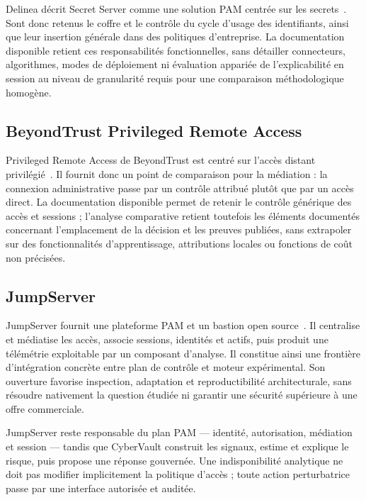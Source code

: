 \documentclass[11pt,a4paper,oneside]{report}
\theoremstyle{definition}
\theoremstyle{plain}
\begin{document}
Delinea décrit Secret Server comme une solution PAM centrée sur les secrets~\cite{ref18}. Sont donc retenus le coffre et le contrôle du cycle d'usage des identifiants, ainsi que leur insertion générale dans des politiques d'entreprise. La documentation disponible retient ces responsabilités fonctionnelles, sans détailler connecteurs, algorithmes, modes de déploiement ni évaluation appariée de l'explicabilité en session au niveau de granularité requis pour une comparaison méthodologique homogène.

\subsection{BeyondTrust Privileged Remote Access}

Privileged Remote Access de BeyondTrust est centré sur l'accès distant privilégié~\cite{ref17}. Il fournit donc un point de comparaison pour la médiation : la connexion administrative passe par un contrôle attribué plutôt que par un accès direct. La documentation disponible permet de retenir le contrôle générique des accès et sessions ; l'analyse comparative retient toutefois les éléments documentés concernant l'emplacement de la décision et les preuves publiées, sans extrapoler sur des fonctionnalités d'apprentissage, attributions locales ou fonctions de coût non précisées.

\subsection{JumpServer}

JumpServer fournit une plateforme PAM et un bastion open source~\cite{ref5}. Il centralise et médiatise les accès, associe sessions, identités et actifs, puis produit une télémétrie exploitable par un composant d'analyse. Il constitue ainsi une frontière d'intégration concrète entre plan de contrôle et moteur expérimental. Son ouverture favorise inspection, adaptation et reproductibilité architecturale, sans résoudre nativement la question étudiée ni garantir une sécurité supérieure à une offre commerciale.

JumpServer reste responsable du plan PAM --- identité, autorisation, médiation et session --- tandis que CyberVault construit les signaux, estime et explique le risque, puis propose une réponse gouvernée. Une indisponibilité analytique ne doit pas modifier implicitement la politique d'accès ; toute action perturbatrice passe par une interface autorisée et auditée.
\end{document}
